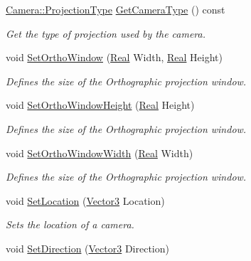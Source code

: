 \begin{DoxyCompactItemize}
\hyperlink{classphys_1_1Camera_a87d8d46e9eb2080b10712079be69d86a}{Camera::ProjectionType} \hyperlink{classphys_1_1Camera_aa79582e78a3eff11a8c4fe9c058566b0}{GetCameraType} () const 
\begin{DoxyCompactList}\small\item\em Get the type of projection used by the camera. \item\end{DoxyCompactList}\item 
void \hyperlink{classphys_1_1Camera_a6a5b1aa3d453486354b24b7e4b918988}{SetOrthoWindow} (\hyperlink{namespacephys_af7eb897198d265b8e868f45240230d5f}{Real} Width, \hyperlink{namespacephys_af7eb897198d265b8e868f45240230d5f}{Real} Height)
\begin{DoxyCompactList}\small\item\em Defines the size of the Orthographic projection window. \item\end{DoxyCompactList}\item 
void \hyperlink{classphys_1_1Camera_a41f859ab51712fb465416e4c7edd29ff}{SetOrthoWindowHeight} (\hyperlink{namespacephys_af7eb897198d265b8e868f45240230d5f}{Real} Height)
\begin{DoxyCompactList}\small\item\em Defines the size of the Orthographic projection window. \item\end{DoxyCompactList}\item 
void \hyperlink{classphys_1_1Camera_abe6bb6c5d46ca588026fb163b4e5d387}{SetOrthoWindowWidth} (\hyperlink{namespacephys_af7eb897198d265b8e868f45240230d5f}{Real} Width)
\begin{DoxyCompactList}\small\item\em Defines the size of the Orthographic projection window. \item\end{DoxyCompactList}\item 
void \hyperlink{classphys_1_1Camera_ab1fb572982464212b2fa33e2df6f688b}{SetLocation} (\hyperlink{classphys_1_1Vector3}{Vector3} Location)
\begin{DoxyCompactList}\small\item\em Sets the location of a camera. \item\end{DoxyCompactList}\item 
void \hyperlink{classphys_1_1Camera_a50746cdd4f7d483edffe87d24d2b4bc6}{SetDirection} (\hyperlink{classphys_1_1Vector3}{Vector3} Direction)

\end{DoxyCompactItemize}
